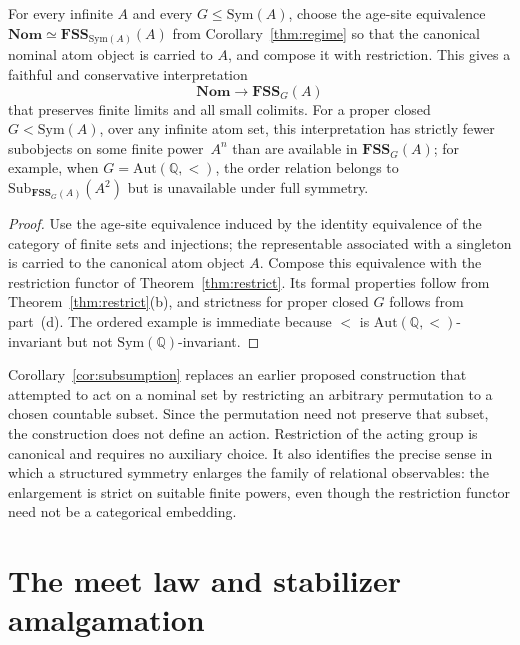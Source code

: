 \documentclass{lmcs}
\newcommand{\Sym}{\mathrm{Sym}}
\newcommand{\Aut}{\mathrm{Aut}}
\newcommand{\Nom}{\mathbf{Nom}}
\newcommand{\FSS}{\mathbf{FSS}}
\newcommand{\Sub}{\mathrm{Sub}}
\begin{document}
\begin{cor}\label{cor:subsumption}
For every infinite $A$ and every $G\leq\Sym(A)$, choose the age-site
equivalence $\Nom\simeq\FSS_{\Sym(A)}(A)$ from
Corollary~\ref{thm:regime} so that the canonical nominal atom object is
carried to $A$, and compose it with restriction. This gives a faithful and
conservative interpretation
\[
   \Nom\longrightarrow\FSS_G(A)
\]
that preserves finite limits and all small colimits.
For a proper closed $G<\Sym(A)$, over any infinite atom set, this interpretation has strictly fewer subobjects on some finite power~$A^n$ than are available in $\FSS_G(A)$; for example, when $G=\Aut(\mathbb Q,<)$, the order relation belongs to $\Sub_{\FSS_G(A)}(A^2)$ but is unavailable under full symmetry.
\end{cor}
\begin{proof}
Use the age-site equivalence induced by the identity equivalence of the category of finite sets and injections; the representable associated with a singleton is carried to the canonical atom object $A$. Compose this equivalence with the restriction functor of Theorem~\ref{thm:restrict}. Its formal properties follow from Theorem~\ref{thm:restrict}(b), and strictness for proper closed $G$ follows from part~(d). The ordered example is immediate because $<$ is $\Aut(\mathbb Q,<)$-invariant but not $\Sym(\mathbb Q)$-invariant.
\end{proof}

\begin{rem}\label{rem:oldphi}
Corollary~\ref{cor:subsumption} replaces an earlier proposed
construction that attempted to act on a nominal set by restricting an
arbitrary permutation to a chosen countable subset. Since the
permutation need not preserve that subset, the construction does not
define an action. Restriction of the acting group is canonical and
requires no auxiliary choice. It also identifies the precise sense in which a structured symmetry
enlarges the family of relational observables: the enlargement is
strict on suitable finite powers, even though the restriction functor
need not be a categorical embedding.
\end{rem}

\section{The meet law and stabilizer amalgamation}\label{sec:meet}
\end{document}
